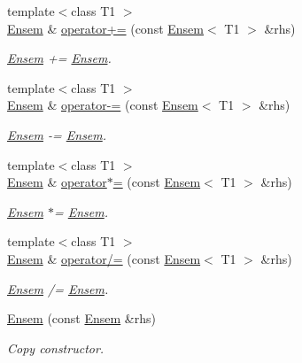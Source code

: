 \begin{DoxyCompactItemize}
{\footnotesize template$<$class T1 $>$ }\\\mbox{\hyperlink{classENSEM_1_1Ensem}{Ensem}} \& \mbox{\hyperlink{classENSEM_1_1Ensem_ae24bd27a7f5a8ffed6ad4361956596fd}{operator+=}} (const \mbox{\hyperlink{classENSEM_1_1Ensem}{Ensem}}$<$ T1 $>$ \&rhs)
\begin{DoxyCompactList}\small\item\em \mbox{\hyperlink{classENSEM_1_1Ensem}{Ensem}} += \mbox{\hyperlink{classENSEM_1_1Ensem}{Ensem}}. \end{DoxyCompactList}\item 
{\footnotesize template$<$class T1 $>$ }\\\mbox{\hyperlink{classENSEM_1_1Ensem}{Ensem}} \& \mbox{\hyperlink{classENSEM_1_1Ensem_ae3f3e36d96a4600e56c2b139e7897186}{operator-\/=}} (const \mbox{\hyperlink{classENSEM_1_1Ensem}{Ensem}}$<$ T1 $>$ \&rhs)
\begin{DoxyCompactList}\small\item\em \mbox{\hyperlink{classENSEM_1_1Ensem}{Ensem}} -\/= \mbox{\hyperlink{classENSEM_1_1Ensem}{Ensem}}. \end{DoxyCompactList}\item 
{\footnotesize template$<$class T1 $>$ }\\\mbox{\hyperlink{classENSEM_1_1Ensem}{Ensem}} \& \mbox{\hyperlink{classENSEM_1_1Ensem_ae6590e101b18547ec3d2682ecbea0371}{operator$\ast$=}} (const \mbox{\hyperlink{classENSEM_1_1Ensem}{Ensem}}$<$ T1 $>$ \&rhs)
\begin{DoxyCompactList}\small\item\em \mbox{\hyperlink{classENSEM_1_1Ensem}{Ensem}} $\ast$= \mbox{\hyperlink{classENSEM_1_1Ensem}{Ensem}}. \end{DoxyCompactList}\item 
{\footnotesize template$<$class T1 $>$ }\\\mbox{\hyperlink{classENSEM_1_1Ensem}{Ensem}} \& \mbox{\hyperlink{classENSEM_1_1Ensem_aa0d7f0d69f4c1c1adc551c91abcf271a}{operator/=}} (const \mbox{\hyperlink{classENSEM_1_1Ensem}{Ensem}}$<$ T1 $>$ \&rhs)
\begin{DoxyCompactList}\small\item\em \mbox{\hyperlink{classENSEM_1_1Ensem}{Ensem}} /= \mbox{\hyperlink{classENSEM_1_1Ensem}{Ensem}}. \end{DoxyCompactList}\item 
\mbox{\hyperlink{classENSEM_1_1Ensem_a5e80cf6ad71f96ba2fa28cac27f06003}{Ensem}} (const \mbox{\hyperlink{classENSEM_1_1Ensem}{Ensem}} \&rhs)
\begin{DoxyCompactList}\small\item\em Copy constructor. \end{DoxyCompactList}\item 

\end{DoxyCompactItemize}
